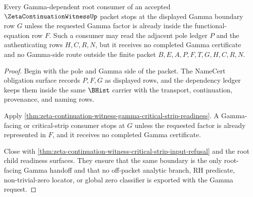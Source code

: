 \begin{theorem}
\label{thm:zeta-continuation-witness-gamma-boundary-root-nonescape}
Every Gamma-dependent root consumer of an accepted $\ZetaContinuationWitnessUp$ packet stops at the displayed Gamma boundary row $G$ unless the requested Gamma factor is already inside the functional-equation row $F$. Such a consumer may read the adjacent pole ledger $P$ and the authenticating rows $H,C,R,N$, but it receives no completed Gamma certificate and no Gamma-side route outside the finite packet $B,E,A,P,F,T,G,H,C,R,N$.
\end{theorem}
\begin{proof}
Begin with the pole and Gamma side of the packet. The NameCert obligation surface records $P,F,G$ as displayed rows, and the dependency ledger keeps them inside the same $\BHist$ carrier with the transport, continuation, provenance, and naming rows.

Apply \autoref{thm:zeta-continuation-witness-gamma-critical-strip-readiness}. A Gamma-facing or critical-strip consumer stops at $G$ unless the requested factor is already represented in $F$, and it receives no completed Gamma certificate.

Close with \autoref{thm:zeta-continuation-witness-critical-strip-input-refusal} and the root child readiness surfaces. They ensure that the same boundary is the only root-facing Gamma handoff and that no off-packet analytic branch, RH predicate, non-trivial-zero locator, or global zero classifier is exported with the Gamma request.
\end{proof}

